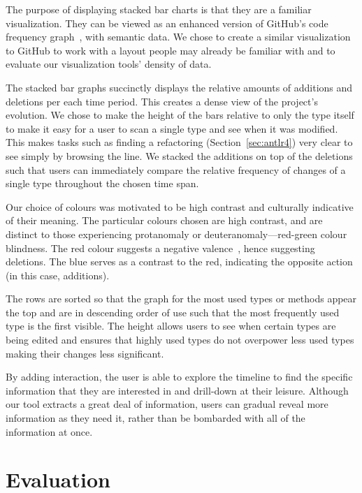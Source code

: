 The purpose of displaying stacked bar charts is that they are a familiar visualization. They can be viewed as an enhanced version of GitHub's code frequency graph~\cite{github-graphs}, with semantic data. We chose to create a similar visualization to GitHub to work with a layout people may already be familiar with and to evaluate our visualization tools' density of data.

The stacked bar graphs succinctly displays the relative amounts of additions and deletions per each time period. This creates a dense view of the project's evolution. We chose to make the height of the bars relative to only the type itself to make it easy for a user to scan a single type and see when it was modified. This makes tasks such as finding a refactoring (Section~\ref{sec:antlr4}) very clear to see simply by browsing the line. We stacked the additions on top of the deletions such that users can immediately compare the relative frequency of changes of a single type throughout the chosen time span.

Our choice of colours was motivated to be high contrast and culturally indicative of their meaning. The particular colours chosen are high contrast, and are distinct to those experiencing protanomaly or deuteranomaly---red-green colour blindness. The red colour suggests a negative valence~\cite{moller2009}, hence suggesting deletions. The blue serves as a contrast to the red, indicating the opposite action (in this case, additions).

The rows are sorted so that the graph for the most used types or methods appear the top and are in descending order of use such that the most frequently used type is the first visible. The height allows users to see when certain types are being edited and ensures that highly used types do not overpower less used types making their changes less significant.

By adding interaction, the user is able to explore the timeline to find the specific information that they are interested in and drill-down at their leisure. Although our tool extracts a great deal of information, users can gradual reveal more information as they need it, rather than be bombarded with all of the information at once.


\section{Evaluation}
\label{sec:eval}

